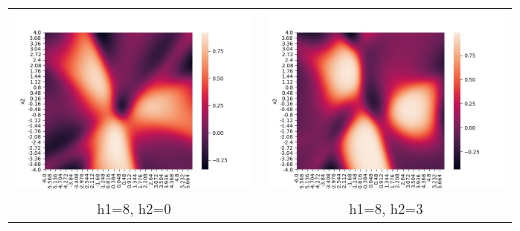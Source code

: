 \documentclass[twoside]{article}
\begin{document}
\begin{tabular}{ cc } 
	\includegraphics[scale=0.5]{heatmaps1/A8_0} & \includegraphics[scale=0.5]{heatmaps1/A8_3} \\ 
	h1=8, h2=0 & h1=8, h2=3 \\ 

\end{tabular}
\end{document}
